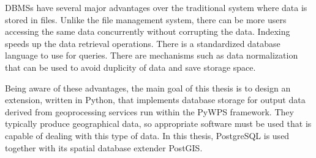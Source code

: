 DBMSs have several major advantages over the traditional system where
data is stored in files. Unlike the file management system, there can
be more users accessing the same data concurrently without corrupting
the data. Indexing speeds up the data retrieval operations. There is a
standardized database language to use for queries. There are
mechanisms such as data normalization that can be used to avoid
duplicity of data and save storage space.
	
Being aware of these advantages, the main goal of this thesis is to
design an extension, written in Python, that implements database
storage for output data derived from geoprocessing services run within
the PyWPS framework. They typically produce geographical data, so
appropriate software must be used that is capable of dealing with this
type of data. In this thesis, PostgreSQL is used together with its
spatial database extender PostGIS.
